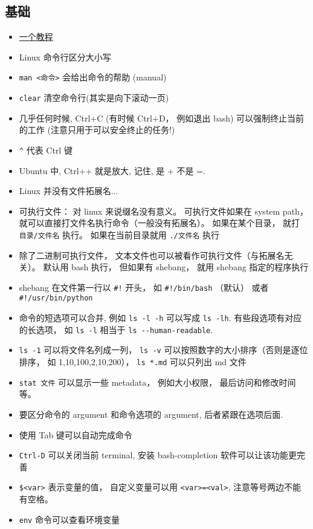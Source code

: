 
\subsection{基础}
\begin{itemize}
\item \href{http://faculty.salina.k-state.edu/tim/unix_sg/index.html}{一个教程}
\item Linux 命令行区分大小写
\item \verb`man <命令>`  会给出命令的帮助 (manual)
\item \verb`clear` 清空命令行(其实是向下滚动一页)
\item 几乎任何时候, Ctrl+C (有时候 Ctrl+D， 例如退出 bash) 可以强制终止当前的工作 (注意只用于可以安全终止的任务!)
\item \verb`^` 代表 Ctrl 键
\item Ubuntu 中, Ctrl++ 就是放大, 记住, 是 + 不是 =.
\item Linux 并没有文件拓展名...
\item 可执行文件： 对 linux 来说缀名没有意义。 可执行文件如果在 system path， 就可以直接打文件名执行命令（一般没有拓展名）。 如果在某个目录， 就打 \verb`目录/文件名` 执行。 如果在当前目录就用 \verb`./文件名` 执行
\item 除了二进制可执行文件， 文本文件也可以被看作可执行文件（与拓展名无关）。 默认用 bash 执行， 但如果有 shebang， 就用 shebang 指定的程序执行
\item shebang 在文件第一行以 \verb`#!` 开头， 如 \verb`#!/bin/bash` （默认） 或者 \verb`#!/usr/bin/python`
\item 命令的短选项可以合并, 例如 \verb`ls -l -h` 可以写成 \verb`ls -lh`. 有些段选项有对应的长选项， 如 \verb`ls -l` 相当于 \verb`ls --human-readable`.
\item \verb`ls -1` 可以将文件名列成一列， \verb`ls -v` 可以按照数字的大小排序（否则是逐位排序， 如 1,10,100,2,10,200）， \verb`ls *.md` 可以只列出 md 文件
\item \verb|stat 文件| 可以显示一些 metadata， 例如大小权限， 最后访问和修改时间等。
\item 要区分命令的 argument 和命令选项的 argument, 后者紧跟在选项后面.
\item 使用 Tab 键可以自动完成命令
\item \verb`Ctrl-D` 可以关闭当前 terminal, 安装 bash-completion 软件可以让该功能更完善
\item \verb`$<var>` 表示变量的值， 自定义变量可以用 \verb`<var>=<val>`, 注意等号两边不能有空格。
\item \verb`env` 命令可以查看环境变量

\end{itemize}
